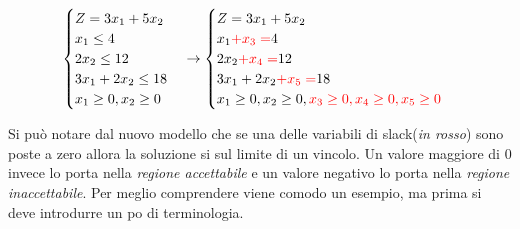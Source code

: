 \documentclass{article}
\begin{document}
$$
  \begin{cases}
    Z = 3x_1 + 5x_2 \\
    x_1 \le 4       \\
    2x_2 \le 12     \\
    3x_1+2x_2\le 18 \\
    x_1 \ge 0,
    x_2 \ge 0
  \end{cases}
  \to
  \begin{cases}
    Z = 3x_1 + 5x_2                     \\
    x_1 \textcolor{red}{+x_3 =}  4      \\
    2x_2 \textcolor{red}{+x_4 =}  12    \\
    3x_1+2x_2\textcolor{red}{+x_5 =} 18 \\
    x_1 \ge 0,
    x_2 \ge 0,
    \textcolor{red}{x_3 \ge 0, x_4 \ge 0, x_5 \ge 0}
  \end{cases}
$$

Si può notare dal nuovo modello che se una delle variabili di slack(\textit{in rosso}) sono poste a zero allora la soluzione si sul limite di un vincolo. Un valore maggiore di $0$ invece lo porta nella \textit{regione accettabile} e un valore negativo lo porta nella \textit{regione inaccettabile}. Per meglio comprendere viene comodo un esempio, ma prima si deve introdurre un po di terminologia.
\end{document}
